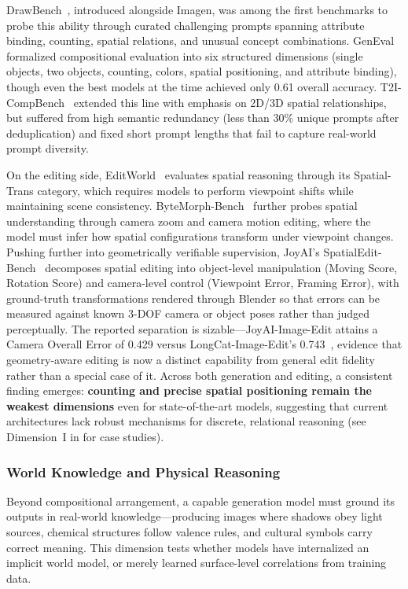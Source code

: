 DrawBench~\citep{saharia2022imagegen}, introduced alongside Imagen, was among the first benchmarks to probe this ability through curated challenging prompts spanning attribute binding, counting, spatial relations, and unusual concept combinations. GenEval~\citep{GenEval} formalized compositional evaluation into six structured dimensions (single objects, two objects, counting, colors, spatial positioning, and attribute binding), though even the best models at the time achieved only 0.61 overall accuracy. T2I-CompBench~\citep{huang2023t2i} extended this line with emphasis on 2D/3D spatial relationships, but suffered from high semantic redundancy (less than 30\% unique prompts after deduplication) and fixed short prompt lengths that fail to capture real-world prompt diversity.

On the editing side, EditWorld~\citep{EditWorld} evaluates spatial reasoning through its Spatial-Trans category, which requires models to perform viewpoint shifts while maintaining scene consistency. ByteMorph-Bench~\citep{ByteMorph} further probes spatial understanding through camera zoom and camera motion editing, where the model must infer how spatial configurations transform under viewpoint changes. Pushing further into geometrically verifiable supervision, JoyAI's SpatialEdit-Bench~\citep{xiao2026spatialedit} decomposes spatial editing into object-level manipulation (Moving Score, Rotation Score) and camera-level control (Viewpoint Error, Framing Error), with ground-truth transformations rendered through Blender so that errors can be measured against known 3-DOF camera or object poses rather than judged perceptually. The reported separation is sizable---JoyAI-Image-Edit attains a Camera Overall Error of 0.429 versus LongCat-Image-Edit's 0.743~\citep{jdjoyaiimage}, evidence that geometry-aware editing is now a distinct capability from general edit fidelity rather than a special case of it. Across both generation and editing, a consistent finding emerges: \textbf{counting and precise spatial positioning remain the weakest dimensions} even for state-of-the-art models, suggesting that current architectures lack robust mechanisms for discrete, relational reasoning (see Dimension~I in  for case studies).


\subsubsection{World Knowledge and Physical Reasoning}

Beyond compositional arrangement, a capable generation model must ground its outputs in real-world knowledge---producing images where shadows obey light sources, chemical structures follow valence rules, and cultural symbols carry correct meaning. This dimension tests whether models have internalized an implicit world model, or merely learned surface-level correlations from training data.


